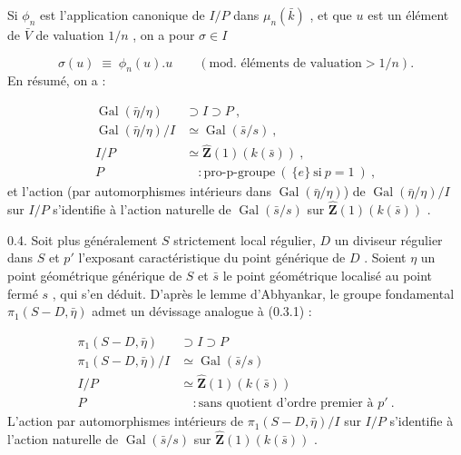 
Si  $\phi_n$  est l'application canonique de  $I/P$  dans  $\mu_n(\bar{k})$ , et que  $u$  est un élément de  $\bar{V}$  de valuation  $1/n$ , on a pour  $\sigma \in I$

\begin{equation*}
\sigma(u) \;\equiv\; \phi_n(u).u \qquad (\text{mod. éléments de valuation} > 1/n).
\end{equation*}
En résumé, on a :

\begin{equation}\tag{0.3.1}
\begin{aligned}
\operatorname{Gal}(\bar\eta/\eta) &\supset I \supset P \ , \\
\operatorname{Gal}(\bar\eta/\eta)/I &\simeq \operatorname{Gal}(\bar s/s) \ , \\
I/P &\simeq \hat{\mathbf{Z}}(1)(k(\bar s)) \ , \\
P &\quad : \text{pro-p-groupe} \ (\ \{e\} \ \text{si} \ p = 1 \ ) \ ,
\end{aligned}
\end{equation}
et l'action (par automorphismes intérieurs dans  $\operatorname{Gal}(\bar\eta/\eta)$) de  $\operatorname{Gal}(\bar\eta/\eta)/I$  sur  $I/P$  s'identifie à l'action naturelle de  $\operatorname{Gal}(\bar s/s)$  sur  $\hat{\mathbf{Z}}(1)(k(\bar s))$  .

0.4.  Soit plus généralement  $S$  strictement local régulier, $D$  un diviseur régulier dans  $S$  et  $p'$  l'exposant caractéristique du point générique de  $D$ . Soient  $\eta$  un point géométrique générique de  $S$  et  $\bar s$  le point géométrique localisé au point fermé  $s$ , qui s'en déduit. D'après le lemme d'Abhyankar, le groupe fondamental  $\pi_1(S\!-\!D,\bar\eta)$  admet un dévissage analogue à (0.3.1) :

\begin{equation}\tag{0.4.1}
\begin{aligned}
\pi_1(S\!-\!D,\bar\eta) &\supset I \supset P \\
\pi_1(S\!-\!D,\bar\eta)/I &\simeq \operatorname{Gal}(\bar s/s) \\
I/P &\simeq \hat{\mathbf{Z}}(1)(k(\bar s)) \\
P &\quad : \text{sans quotient d'ordre premier à } p' \ .
\end{aligned}
\end{equation}
L'action par automorphismes intérieurs de  $\pi_1(S\!-\!D,\bar\eta)/I$  sur  $I/P$  s'identifie à l'action naturelle de  $\operatorname{Gal}(\bar s/s)$  sur  $\hat{\mathbf{Z}}(1)(k(\bar s))$  .


